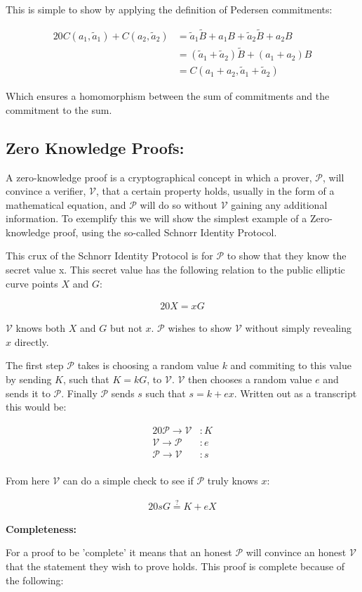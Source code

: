 \documentclass{article}
\newcommand{\eq}[1]{\begin{alignat*}{20}#1\end{alignat*}}
\newcommand{\V}{\mathcal{V}}
\renewcommand{\P}{\mathcal{P}}
\newcommand{\tB}{\widetilde{B}}
\begin{document}
This is simple to show by applying the definition of Pedersen
commitments: 

\eq{
	C(a_1,\widetilde{a}_1) + C(a_2,\widetilde{a}_2) &= \widetilde{a}_1\tB + a_1B  + \widetilde{a}_2\tB + a_2B \\
	                        &= (\widetilde{a}_1 + \widetilde{a}_2)\tB + (a_1 + a_2)B \\
	                        &= C(a_1 + a_2, \widetilde{a}_1 + \widetilde{a}_2)
}

Which ensures a homomorphism between the sum of commitments and the
commitment to the sum.

\subsection{Zero Knowledge Proofs:}\label{zero-knowledge}

A zero-knowledge proof is a cryptographical concept in which a prover,
$\P$, will convince a verifier, $\V$, that a certain property holds,
usually in the form of a mathematical equation, and $\P$ will do so
without $\V$ gaining any additional information. To exemplify this we
will show the simplest example of a Zero-knowledge proof, using the
so-called Schnorr Identity Protocol.

This crux of the Schnorr Identity Protocol is for $\P$ to show that
they know the secret value x. This secret value has the following
relation to the public elliptic curve points $X$ and $G$:

\eq{
	X = xG
}

$\V$ knows both $X$ and $G$ but not $x$. $\P$ wishes to show $\V$
without simply revealing $x$ directly.

The first step $\P$ takes is choosing a random value $k$ and commiting
to this value by sending $K$, such that $K = kG$, to $\V$. $\V$ then
chooses a random value $e$ and sends it to $\P$. Finally $\P$ sends $s$
such that $s = k + ex$. Written out as a transcript this would be:

\eq{
	\P \rightarrow \V &: K \\
	\V \rightarrow \P &: e \\
	\P \rightarrow \V &: s \\
}

From here $\V$ can do a simple check to see if $\P$ truly knows $x$:

\eq{
	sG \stackrel{?}{=} K + eX
}


\textbf{Completeness:}

For a proof to be 'complete' it means that an honest $\P$ will convince
an honest $\V$ that the statement they wish to prove holds. This proof
is complete because of the following:
\end{document}
